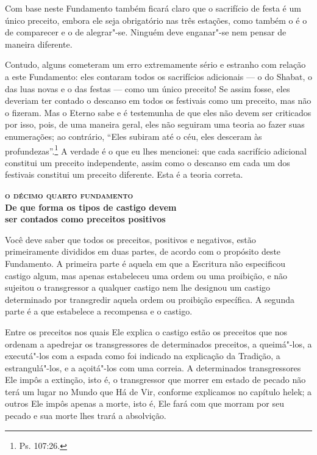 Com base neste Fundamento também ficará claro que o sacrifício de festa
é um único preceito, embora ele seja obrigatório nas três estações,
como também o é o de comparecer e o de alegrar"-se. Ninguém deve
enganar"-se nem pensar de maneira diferente.

Contudo, alguns cometeram um erro extremamente sério e estranho com
relação a este Fundamento: eles contaram todos os sacrifícios adicionais
--- o do Shabat, o das luas novas e o das festas --- como um único
preceito! Se assim fosse, eles deveriam ter contado o descanso em todos
os festivais como um preceito, mas não o fizeram. Mas o Eterno sabe e é
testemunha de que eles não devem ser criticados por isso, pois, de uma
maneira geral, eles não seguiram uma teoria ao fazer suas enumerações;
ao contrário, ``Eles subiram até o céu, eles desceram às profundezas''.\footnote{Ps. 107:26.} A verdade é o que eu lhes mencionei: que cada sacrifício
adicional constitui um preceito independente, assim como o descanso em
cada um dos festivais constitui um preceito diferente. Esta é a teoria
correta.


\bigskip

\noindent\textbf{\textsc{o décimo quarto fundamento}\\De que forma os tipos de castigo devem\\ ser contados como preceitos positivos}

\smallskip

Você deve saber que todos os preceitos, positivos e negativos, estão
primeiramente divididos em duas partes, de acordo com o propósito deste
Fundamento. A primeira parte é aquela em que a Escritura não
especificou castigo algum, mas apenas estabeleceu uma ordem ou uma
proibição, e não sujeitou o transgressor a qualquer castigo nem lhe
designou um castigo determinado por transgredir aquela ordem ou
proibição específica. A segunda parte é a que estabelece a recompensa e
o castigo.

Entre os preceitos nos quais Ele explica o castigo estão os preceitos
que nos ordenam a apedrejar os transgressores de determinados preceitos,
a queimá"-los, a executá"-los com a espada como foi indicado na explicação
da Tradição, a estrangulá"-los, e a açoitá"-los com uma correia. A
determinados transgressores Ele impôs a extinção, isto é, o
transgressor que morrer em estado de pecado não terá um lugar no Mundo
que Há de Vir, conforme explicamos no capítulo helek\starr; a outros Ele
impôs apenas a morte, isto é, Ele fará com que morram por seu pecado e
sua morte lhes trará a absolvição.

